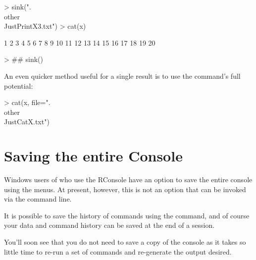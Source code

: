 \begin{Schunk}
\begin{Sinput}
> sink(".\\other\\JustPrintX3.txt")
> cat(x)
\end{Sinput}
\begin{Soutput}
1 2 3 4 5 6 7 8 9 10 11 12 13 14 15 16 17 18 19 20
\end{Soutput}
\begin{Sinput}
> ## sink()
\end{Sinput}
\end{Schunk}

An even quicker method useful for a single result is to use the  command's full potential: 

\begin{Schunk}
\begin{Sinput}
> cat(x, file=".\\other\\JustCatX.txt") 
\end{Sinput}
\end{Schunk}

 
 
\section{Saving the entire \R{} Console} 
 
Windows users of \R{} who use the RConsole have an option to save the entire console using the menus. At present, however, this is not an option that can be invoked via the command line. 
 
It is possible to save the history of commands using the  command, and of course your data and command history can be saved at the end of a session. 
 
You'll soon see that you do not need to save a copy of the \R{} console as it takes so little time to re-run a set of commands and re-generate the output desired. 
 
 
 



